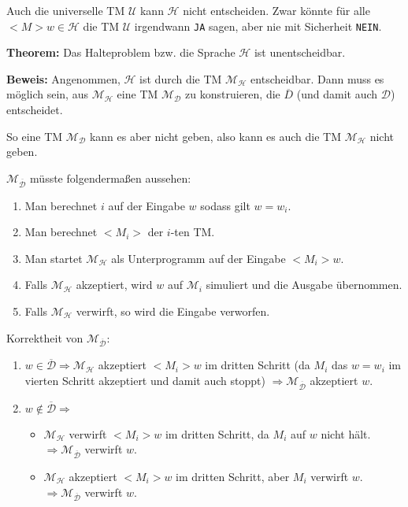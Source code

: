 \documentclass{scrartcl}%
\begin{document}
    \vspace*{0.3cm}
    Auch die universelle TM $\mathcal{U}$ kann $\mathcal{H}$ nicht entscheiden.
    Zwar könnte für alle $<M>w \in \mathcal{H}$ die TM $\mathcal{U}$ irgendwann \texttt{JA} sagen,
    aber nie mit Sicherheit \texttt{NEIN}.

    \vspace*{0.5cm}
    \textbf{\textsf{Theorem:}} Das Halteproblem bzw. die Sprache $\mathcal{H}$ ist unentscheidbar.

    \vspace*{0.3cm}
    \textbf{\textsf{Beweis:}} Angenommen, $\mathcal{H}$ ist durch die TM $\mathcal{M}_\mathcal{H}$ entscheidbar.
    Dann muss es möglich sein, aus $\mathcal{M}_\mathcal{H}$ eine TM  $\mathcal{M}_\mathcal{D}$ zu konstruieren, die
    $\overline{D}$ (und damit auch $\mathcal{D}$) entscheidet.

    So eine TM $\mathcal{M}_\mathcal{D}$ kann es aber nicht geben, also kann es auch die TM $\mathcal{M}_\mathcal{H}$ nicht geben.

    \vspace*{0.3cm}
    $\mathcal{M}_{\overline{\mathcal{D}}}$ müsste folgendermaßen aussehen:
    \begin{enumerate}
        \item Man berechnet $i$ auf der Eingabe $w$ sodass gilt $w = w_i$.
        \item Man berechnet $<M_{i}>$ der $i$-ten TM.
        \item Man startet $\mathcal{M}_\mathcal{H}$ als Unterprogramm auf der Eingabe $<M_i>w$.
        \item Falls $\mathcal{M}_\mathcal{H}$ akzeptiert, wird $w$ auf $\mathcal{M}_i$ simuliert und die Ausgabe übernommen.
        \item Falls $\mathcal{M}_\mathcal{H}$ verwirft, so wird die Eingabe verworfen.
    \end{enumerate}

    Korrektheit von $\mathcal{M}_{\overline{\mathcal{D}}}$:
    \begin{enumerate}
        \item $w \in \overline{\mathcal{D}} \Rightarrow \mathcal{M}_\mathcal{H}$ akzeptiert $<M_{i}>w$ im dritten Schritt
        (da $M_i$ das $w=w_i$ im vierten Schritt akzeptiert und damit auch stoppt)
        $\Rightarrow \mathcal{M}_{\overline{\mathcal{D}}}$ akzeptiert $w$.
        \item $w \notin \overline{\mathcal{D}} \Rightarrow$
        \begin{itemize}
            \item $\mathcal{M}_\mathcal{H}$ verwirft $<M_{i}>w$ im dritten Schritt, da $M_i$ auf $w$ nicht hält.
            \newline $\Rightarrow \mathcal{M}_{\overline{\mathcal{D}}}$ verwirft $w$.
            \item $\mathcal{M}_\mathcal{H}$ akzeptiert $<M_{i}>w$ im dritten Schritt, aber $M_i$ verwirft $w$.
            \newline $\Rightarrow \mathcal{M}_{\overline{\mathcal{D}}}$ verwirft $w$.
        \end{itemize}
    \end{enumerate}\proofend
\end{document}

